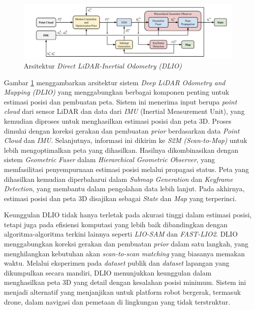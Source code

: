 \begin{figure} [H] \centering
  \includegraphics[scale=0.6]{gambar/bab2/dlio_Arch.png}
  \caption{Arsitektur \emph{Direct LiDAR-Inertial Odometry (DLIO)} \cite{chen2022dlio}}
  \label{fig:DLIO Architecture}
\end{figure}

Gambar \ref{fig:DLIO Architecture} menggambarkan arsitektur sistem \emph{Deep LiDAR Odometry and Mapping (DLIO)} yang menggabungkan berbagai komponen penting untuk estimasi posisi dan pembuatan peta. Sistem ini menerima input berupa \emph{point cloud} dari sensor LiDAR dan data dari \emph{IMU} (Inertial Measurement Unit), yang kemudian diproses untuk menghasilkan estimasi posisi dan peta 3D. Proses dimulai dengan koreksi gerakan dan pembuatan \emph{prior} berdasarkan data \emph{Point Cloud} dan \emph{IMU}. Selanjutnya, informasi ini dikirim ke \emph{S2M (Scan-to-Map)} untuk lebih mengoptimalkan peta yang dihasilkan. Hasilnya dikombinasikan dengan sistem \emph{Geometric Fuser} dalam \emph{Hierarchical Geometric Observer}, yang memfasilitasi penyempurnaan estimasi posisi melalui propagasi status. Peta yang dihasilkan kemudian diperbaharui dalam \emph{Submap Generation} dan \emph{Keyframe Detection}, yang membantu dalam pengolahan data lebih lanjut. Pada akhirnya, estimasi posisi dan peta 3D disajikan sebagai \emph{State} dan \emph{Map} yang terperinci.

Keunggulan DLIO tidak hanya terletak pada akurasi tinggi dalam estimasi posisi, tetapi juga pada efisiensi komputasi yang lebih baik dibandingkan dengan algoritma-algoritma terkini lainnya seperti \emph{LIO-SAM} dan \emph{FAST-LIO2}. DLIO menggabungkan koreksi gerakan dan pembuatan \emph{prior} dalam satu langkah, yang menghilangkan kebutuhan akan \emph{scan-to-scan matching} yang biasanya memakan waktu. Melalui eksperimen pada \emph{dataset} publik dan \emph{dataset} lapangan yang dikumpulkan secara mandiri, DLIO menunjukkan keunggulan dalam menghasilkan peta 3D yang detail dengan kesalahan posisi minimum. Sistem ini menjadi alternatif yang menjanjikan untuk platform robot bergerak, termasuk drone, dalam navigasi dan pemetaan di lingkungan yang tidak terstruktur.


